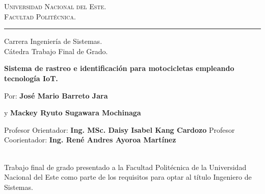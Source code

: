 \vspace*{-3cm}
\begin{figure}[h]
\leavevmode
\begin{minipage}{\textwidth}
\begin{center}
\end{center}
\end{minipage}
\end{figure}

\thispagestyle{empty}

{\bf
\begin{center}
\large
\vspace*{-1 cm}\Large \textsc{Universidad Nacional del Este.} \\
\Large \textsc{Facultad Politécnica.} \\
\vspace*{0.5 cm}\hrule
\vspace*{0.5 cm}\Large Carrera Ingeniería de Sistemas.\\
\vspace*{0 cm}\Large Cátedra Trabajo Final de Grado.\\
\end{center}
}

\vspace{3.5 cm}
{
\noindent
\begin{center}
\huge \bf  Sistema de rastreo e identificación para motocicletas empleando tecnología IoT.
\end{center}
}


\vspace{0.5 cm}
{ 

Por: \textbf{\Large José Mario Barreto Jara}

y \textbf{\Large Mackey Ryuto Sugawara Mochinaga
}


\vspace*{.5 cm}
Profesor Orientador: \textbf{\large  Ing. MSc. Daisy Isabel Kang Cardozo}
Profesor Coorientador: \textbf{\large  Ing. René Andres Ayoroa Martínez }
}
\vspace*{0.5 cm}\\
Trabajo final de grado presentado a la Facultad Politécnica de la Universidad Nacional del Este como parte de los requisitos para optar al título Ingeniero de Sistemas.


